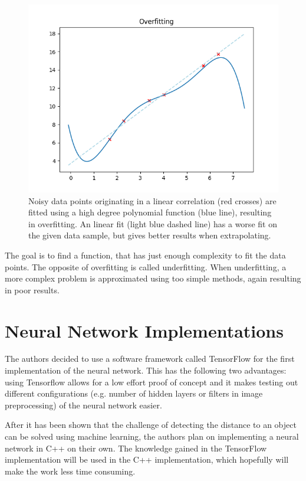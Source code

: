 \begin{figure}[h!]
	\centering
	\includegraphics[width=4.5in]{img/methodology_neuralNetwork_overfitting.png}
	\caption{Noisy data points originating in a linear correlation (red crosses) are fitted using a high degree polynomial function (blue line), resulting in overfitting. An linear fit (light blue dashed line) has a worse fit on the given data sample, but gives better results when extrapolating.}
	\label{pic:methodology_neuralNetwork_overfitting}
\end{figure}

The goal is to find a function, that has just enough complexity to fit the data points. The opposite of overfitting is called underfitting. When underfitting, a more complex problem is approximated using too simple methods, again resulting in poor results.

\section{Neural Network Implementations}
The authors decided to use a software framework called TensorFlow for the first implementation of the neural network. This has the following two advantages: using Tensorflow allows for a low effort proof of concept and it makes testing out different configurations (e.g. number of hidden layers or filters in image preprocessing) of the neural network easier.

After it has been shown that the challenge of detecting the distance to an object can be solved using machine learning, the authors plan on implementing a neural network in C++ on their own. The knowledge gained in the TensorFlow implementation will be used in the C++ implementation, which hopefully will make the work less time consuming.


